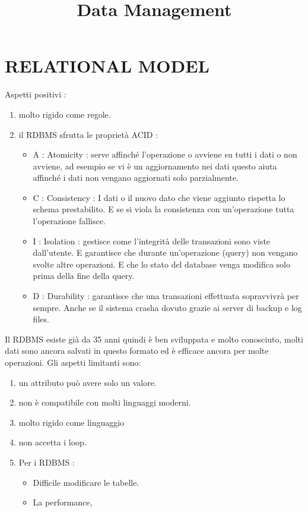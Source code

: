 \documentclass[a4page, 11pt]{article}
\title{Data Management}
\author{}
\date{}
\begin{document}
\maketitle
\section{RELATIONAL MODEL}

Aspetti positivi :

\begin{enumerate}[noitemsep]
	 
	\item
	molto rigido come regole.
	\item
	il RDBMS sfrutta le proprietà ACID :
	\begin{itemize}
		
		\item
		A : Atomicity : serve affinché l'operazione o avviene su tutti i dati
		o non avviene, ad esempio se vi è un aggiornamento nei dati questo
		aiuta affinché i dati non vengano aggiornati solo parzialmente.
		\item
		C : Consistency : I dati o il nuovo dato che viene aggiunto rispetta
		lo schema prestabilito. E se si viola la consistenza con un'operazione
		tutta l'operazione fallisce.
		\item
		I : Isolation : gestisce come l'integrità delle transazioni sono viste
		dall'utente. E garantisce che durante un'operazione (query) non
		vengano svolte altre operazioni. E che lo stato del database venga
		modifica solo prima della fine della query.
		\item
		D : Durability : garantisce che una transazioni effettuata sopravvivrà
		per sempre. Anche se il sistema crasha dovuto grazie ai server di
		backup e log files.
	\end{itemize}
\end{enumerate}




Il RDBMS esiste già da 35 anni quindi è ben sviluppata e molto
conosciuto, molti dati sono ancora salvati in questo formato ed è efficace ancora per molte operazioni. Gli aspetti limitanti sono:

\begin{enumerate}[noitemsep]
	 
	\item
	un attributo può avere solo un valore.
	\item
	non è compatibile con molti linguaggi moderni.
	\item
	molto rigido come linguaggio
	\item
	non accetta i loop.
	\item
	Per i RDBMS :
	\begin{itemize}
		
		\item
		Difficile modificare le tabelle.
		\item
		La performance,
	\end{itemize}
\end{enumerate}
\end{document}
